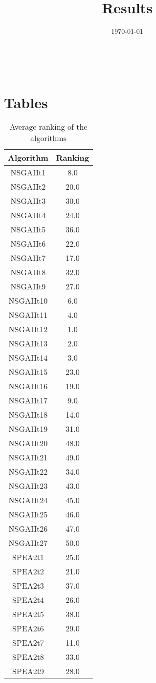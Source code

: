 \documentclass{article}
\title{Results}
\author{}
\date{\today}
\begin{document}
\oddsidemargin 0in \topmargin 0in\maketitle
\
\section{Tables}
\begin{table}[!htp]
\centering
\caption{Average ranking of the algorithms}
\begin{tabular}{c|c}
Algorithm&Ranking\\
\hline
NSGAIIt1&8.0\\
NSGAIIt2&20.0\\
NSGAIIt3&30.0\\
NSGAIIt4&24.0\\
NSGAIIt5&36.0\\
NSGAIIt6&22.0\\
NSGAIIt7&17.0\\
NSGAIIt8&32.0\\
NSGAIIt9&27.0\\
NSGAIIt10&6.0\\
NSGAIIt11&4.0\\
NSGAIIt12&1.0\\
NSGAIIt13&2.0\\
NSGAIIt14&3.0\\
NSGAIIt15&23.0\\
NSGAIIt16&19.0\\
NSGAIIt17&9.0\\
NSGAIIt18&14.0\\
NSGAIIt19&31.0\\
NSGAIIt20&48.0\\
NSGAIIt21&49.0\\
NSGAIIt22&34.0\\
NSGAIIt23&43.0\\
NSGAIIt24&45.0\\
NSGAIIt25&46.0\\
NSGAIIt26&47.0\\
NSGAIIt27&50.0\\
SPEA2t1&25.0\\
SPEA2t2&21.0\\
SPEA2t3&37.0\\
SPEA2t4&26.0\\
SPEA2t5&38.0\\
SPEA2t6&29.0\\
SPEA2t7&11.0\\
SPEA2t8&33.0\\
SPEA2t9&28.0\\

\end{tabular}
\end{table}
\end{document}

